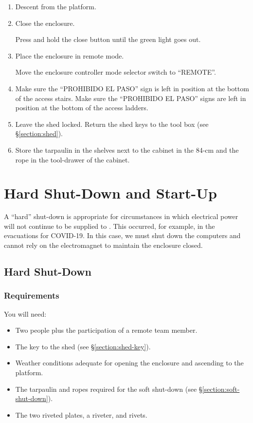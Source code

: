 \begin{enumerate}
\item Descent from the platform.

\item Close the enclosure. 

Press and hold the close button until the green light goes out.

\item
Place the enclosure in remote mode.

Move the enclosure controller mode selector switch to “REMOTE”.

\item
\ifcoatlioan
Make sure the “PROHIBIDO EL PASO” sign is left in position at the bottom of the access stairs.
\fi
\ifddotioan
Make sure the “PROHIBIDO EL PASO” signs are left in position at the bottom of the access ladders.
\fi

\item
Leave the shed locked. Return the shed keys to the tool box (see \S\ref{section:shed}).

\item
Store the tarpaulin in the shelves next to the cabinet in the 84-cm and the rope in the tool-drawer of the cabinet.

\end{enumerate}

\section{Hard Shut-Down and Start-Up}

A “hard” shut-down is appropriate for circumstances in which electrical power will not continue to be supplied to {\projectname}. This occurred, for example, in the evacuations for COVID-19. In this case, we must shut down the computers and cannot rely on the electromagnet to maintain the enclosure closed.

\subsection{Hard Shut-Down}

\subsubsection{Requirements}

You will need:

\begin{itemize}
    \item Two people plus the participation of a remote team member.
    \item The key to the shed (see \S\ref{section:shed-key}).
    \item Weather conditions adequate for opening the enclosure and ascending to the platform.
    \item The tarpaulin and ropes required for the soft shut-down (see \S\ref{section:soft-shut-down}).
    \item The two riveted plates, a riveter, and rivets.
\end{itemize}

